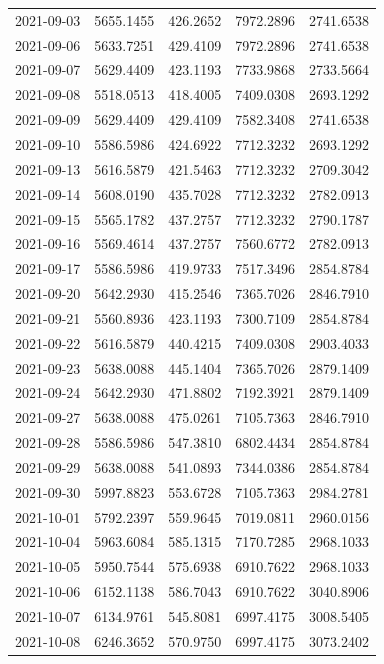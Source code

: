 \begin{footnotesize}
\begin{longtable}{lllll}
2021-09-03 & 5655.1455 & 426.2652 & 7972.2896 & 2741.6538 \\
2021-09-06 & 5633.7251 & 429.4109 & 7972.2896 & 2741.6538 \\
2021-09-07 & 5629.4409 & 423.1193 & 7733.9868 & 2733.5664 \\
2021-09-08 & 5518.0513 & 418.4005 & 7409.0308 & 2693.1292 \\
2021-09-09 & 5629.4409 & 429.4109 & 7582.3408 & 2741.6538 \\
2021-09-10 & 5586.5986 & 424.6922 & 7712.3232 & 2693.1292 \\
2021-09-13 & 5616.5879 & 421.5463 & 7712.3232 & 2709.3042 \\
2021-09-14 & 5608.0190 & 435.7028 & 7712.3232 & 2782.0913 \\
2021-09-15 & 5565.1782 & 437.2757 & 7712.3232 & 2790.1787 \\
2021-09-16 & 5569.4614 & 437.2757 & 7560.6772 & 2782.0913 \\
2021-09-17 & 5586.5986 & 419.9733 & 7517.3496 & 2854.8784 \\
2021-09-20 & 5642.2930 & 415.2546 & 7365.7026 & 2846.7910 \\
2021-09-21 & 5560.8936 & 423.1193 & 7300.7109 & 2854.8784 \\
2021-09-22 & 5616.5879 & 440.4215 & 7409.0308 & 2903.4033 \\
2021-09-23 & 5638.0088 & 445.1404 & 7365.7026 & 2879.1409 \\
2021-09-24 & 5642.2930 & 471.8802 & 7192.3921 & 2879.1409 \\
2021-09-27 & 5638.0088 & 475.0261 & 7105.7363 & 2846.7910 \\
2021-09-28 & 5586.5986 & 547.3810 & 6802.4434 & 2854.8784 \\
2021-09-29 & 5638.0088 & 541.0893 & 7344.0386 & 2854.8784 \\
2021-09-30 & 5997.8823 & 553.6728 & 7105.7363 & 2984.2781 \\
2021-10-01 & 5792.2397 & 559.9645 & 7019.0811 & 2960.0156 \\
2021-10-04 & 5963.6084 & 585.1315 & 7170.7285 & 2968.1033 \\
2021-10-05 & 5950.7544 & 575.6938 & 6910.7622 & 2968.1033 \\
2021-10-06 & 6152.1138 & 586.7043 & 6910.7622 & 3040.8906 \\
2021-10-07 & 6134.9761 & 545.8081 & 6997.4175 & 3008.5405 \\
2021-10-08 & 6246.3652 & 570.9750 & 6997.4175 & 3073.2402 \\

\end{longtable}
\end{footnotesize}
